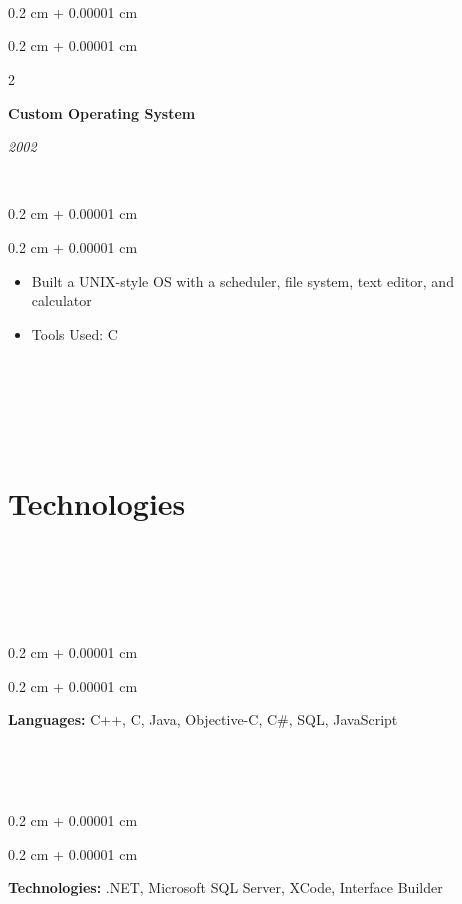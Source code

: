 \documentclass[10pt, letterpaper]{article}
\newenvironment{highlights}{

    \begin{itemize}[

        topsep=0.10 cm,

        parsep=0.10 cm,

        partopsep=0pt,

        itemsep=0pt,

        leftmargin=0.4 cm + 10pt

    ]

}{

    \end{itemize}

} %
\newenvironment{onecolentry}{

    \begin{adjustwidth}{

        0.2 cm + 0.00001 cm

    }{

        0.2 cm + 0.00001 cm

    }

}{

    \end{adjustwidth}

} %
\newenvironment{twocolentry}[2][]{

    \onecolentry

    \def\secondColumn{#2}

    \setcolumnwidth{\fill, 4.5 cm}

    \begin{paracol}{2}

}{

    \switchcolumn \raggedleft \secondColumn

    \end{paracol}

    \endonecolentry

} %
\begin{document}
​

​

        \vspace{0.2 cm}

​

        \begin{twocolentry}{

            

            

        \textit{2002}}

            \textbf{Custom Operating System}

        \end{twocolentry}

​

        \vspace{0.10 cm}

        \begin{onecolentry}

            \begin{highlights}

                \item Built a UNIX-style OS with a scheduler, file system, text editor, and calculator

                \item Tools Used: C

            \end{highlights}

        \end{onecolentry}

​

​

​

    

    \section{Technologies}

​

​

​

        

        \begin{onecolentry}

            \textbf{Languages:} C++, C, Java, Objective-C, C\#, SQL, JavaScript

        \end{onecolentry}

​

        \vspace{0.2 cm}

​

        \begin{onecolentry}

            \textbf{Technologies:} .NET, Microsoft SQL Server, XCode, Interface Builder

        \end{onecolentry}

​

​

    

​
\end{document}
